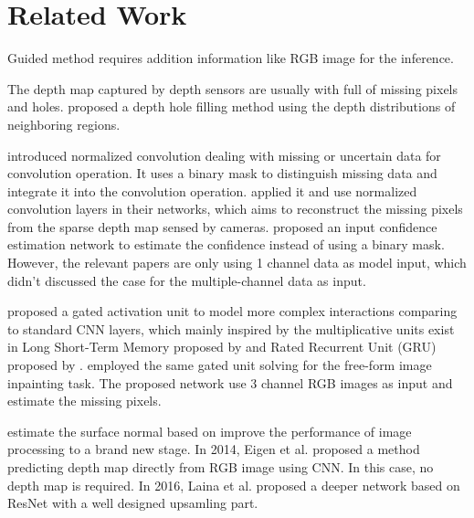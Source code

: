 
\chapter{Related Work} %

\label{ch:02} %




Guided method \cite{guided} requires addition information like RGB image for the inference.



The depth map captured by depth sensors are usually with full of missing pixels and holes.
\cite{depth-inpainting-distribution} proposed a depth hole filling method using the depth distributions of neighboring regions. 

\cite{nconv} introduced normalized convolution dealing with missing or uncertain data for convolution operation. It uses a binary mask to distinguish missing data and integrate it into the convolution operation. \cite{ncnn} applied it and use normalized convolution layers in their networks, which aims to reconstruct the missing pixels from the sparse depth map sensed by cameras. \cite{pncnn} proposed an input confidence estimation network to estimate the confidence instead of using a binary mask. However, the relevant papers are only using 1 channel data as model input, which didn't discussed the case for the multiple-channel data as input.

\cite{gated_activation} proposed a gated activation unit to model more complex interactions comparing to standard CNN layers, which mainly inspired by the multiplicative units exist in Long Short-Term Memory proposed by \cite{lstm} and Rated Recurrent Unit (GRU) proposed by \cite{gru}. 
\cite{gconv} employed the same gated unit solving for the free-form image inpainting task. The proposed network use 3 channel RGB images as input and estimate the missing pixels. 






estimate the surface normal based on improve the performance of image processing to a brand new stage. 
In 2014, Eigen et al.\cite{Eigen} proposed a method predicting depth map directly from RGB image using CNN. In this case, no depth map is required. In 2016, Laina et al. \cite{img2depth} proposed a deeper network based on ResNet \cite{resnet} with a well designed upsamling part. 

